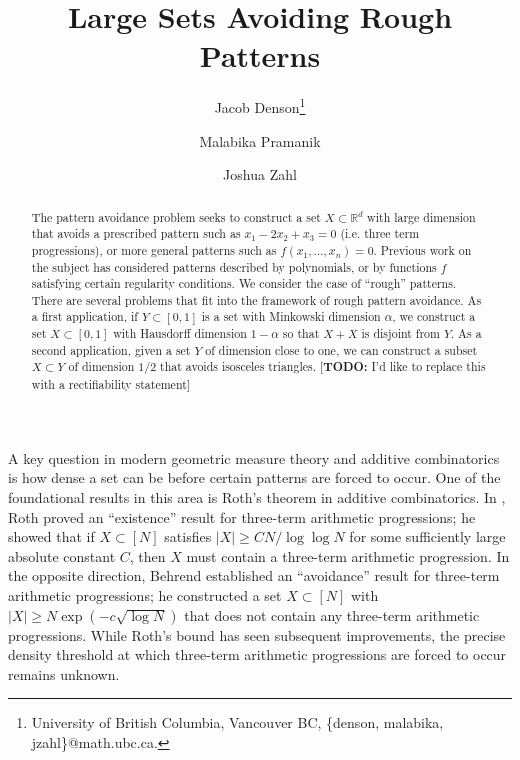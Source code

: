 \documentclass[usenames,dvipsnames,letterpaper, reqno,11pt]{article}
\title{Large Sets Avoiding Rough Patterns}
\author{Jacob Denson\thanks{University of British Columbia, Vancouver BC, \{denson, malabika, jzahl\}@math.ubc.ca.} \and Malabika Pramanik\footnotemark[1] \and Joshua Zahl\footnotemark[1]}
\theoremstyle{plain}
\theoremstyle{plain}
\newcommand{\RR}{\mathbb{R}}
\begin{document}
\maketitle










\begin{abstract}
	The pattern avoidance problem seeks to construct a set $X\subset \RR^d$ with large dimension that avoids a prescribed pattern such as $x_1-2x_2+x_3=0$ (i.e. three term progressions), or more general patterns such as $f(x_1,\ldots,x_n)=0$. Previous work on the subject has considered patterns described by polynomials, or by functions $f$ satisfying certain regularity conditions. We consider the case of ``rough'' patterns. There are several problems that fit into the framework of rough pattern avoidance. As a first application, if $Y\subset[0,1]$ is a set with Minkowski dimension $\alpha$, we construct a set $X\subset[0,1]$ with Hausdorff dimension $1-\alpha$ so that $X+X$ is disjoint from $Y$. As a second application, given a set $Y$ of dimension close to one, we can construct a subset $X\subset Y$ of dimension $1/2$ that avoids isosceles triangles. [{\bf{TODO:}} I'd like to replace this with a rectifiability statement]
\end{abstract}



A key question in modern geometric measure theory and additive combinatorics is how dense a set can be before certain patterns are forced to occur. One of the foundational results in this area is Roth's theorem in additive combinatorics. In \cite{Roth}, Roth proved an ``existence'' result for three-term arithmetic progressions; he showed that if $X\subset[N]$ satisfies $|X|\geq CN/\log\log N$ for some sufficiently large absolute constant $C$, then $X$ must contain a three-term arithmetic progression. In the opposite direction, Behrend \cite{Behrend} established an ``avoidance'' result for three-term arithmetic progressions; he constructed a set $X\subset[N]$ with $|X|\geq N\exp(-c\sqrt{\log N})$ that does not contain any three-term arithmetic progressions. While Roth's bound has seen subsequent improvements, the precise density threshold at which three-term arithmetic progressions are forced to occur remains unknown. 
\end{document}
